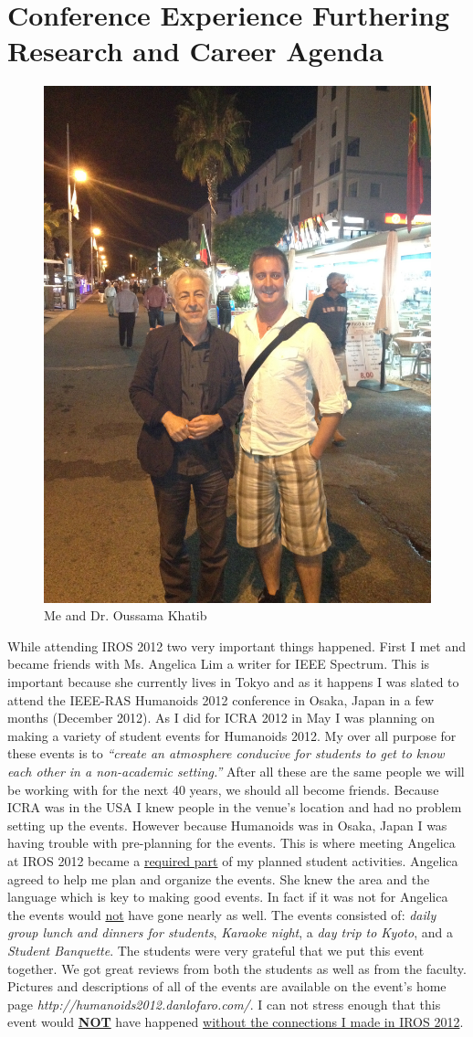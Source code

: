 \documentclass[11pt,a4paper,oneside]{report}
\begin{document}
\section*{Conference Experience Furthering Research and Career Agenda}

\begin{figure}
  \centering
\includegraphics[width=0.5\columnwidth]{./IMG_1656.jpg}
  \caption{ Me and Dr. Oussama Khatib}
  \label{fig:graph}
\end{figure}

While attending IROS 2012 two very important things happened.  
First I met and became friends with Ms. Angelica Lim a writer for IEEE Spectrum.
This is important because she currently lives in Tokyo and as it happens I was slated to attend the IEEE-RAS Humanoids 2012 conference in Osaka, Japan in a few months (December 2012).
As I did for ICRA 2012 in May I was planning on making a variety of student events for Humanoids 2012.
My over all purpose for these events is to \textit{``create an atmosphere conducive for students to get to know each other in a non-academic setting.''}
After all these are the same people we will be working with for the next 40 years, we should all become friends.
Because ICRA was in the USA I knew people in the venue's location and had no problem setting up the events.
However because Humanoids was in Osaka, Japan I was having trouble with pre-planning for the events.
This is where meeting Angelica at IROS 2012 became a \underline{required part} of my planned student activities.
Angelica agreed to help me plan and organize the events.
She knew the area and the language which is key to making good events.
In fact if it was not for Angelica the events would \underline{not} have gone nearly as well.
The events consisted of:  \textit{daily group lunch and dinners for students}, \textit{Karaoke night}, a \textit{day trip to Kyoto}, and a \textit{Student Banquette}.
The students were very grateful that we put this event together.  
We got great reviews from both the students as well as from the faculty.
Pictures and descriptions of all of the events are available on the event's home page \textit{http://humanoids2012.danlofaro.com/}.
I can not stress enough that this event would \underline{\textbf{NOT}} have happened \underline{without the connections I made in IROS 2012}.
\end{document}
